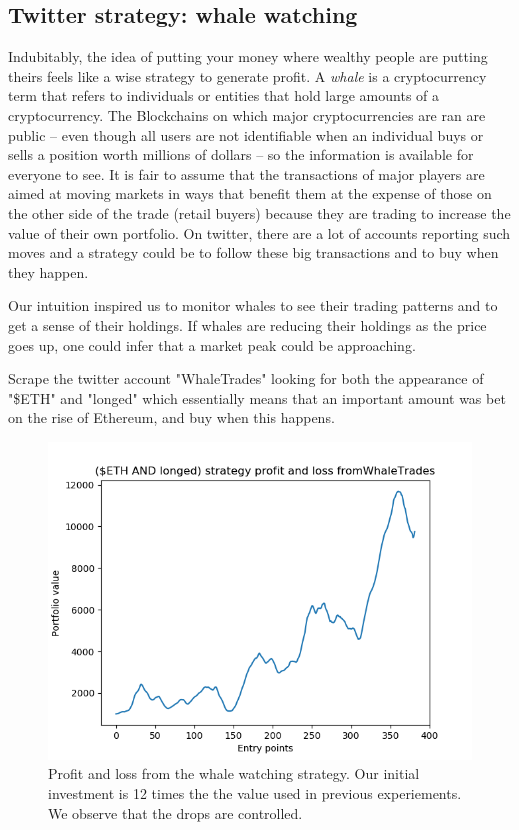 \documentclass[twoside]{report}
\begin{document}
\begin{spacing}{1}
\subsection{Twitter strategy: whale watching}
Indubitably, the idea of putting your money where wealthy people are putting theirs feels like a wise strategy to generate profit. A \textit{whale} is a cryptocurrency term that refers to individuals or entities that hold large amounts of a cryptocurrency. The Blockchains on which major cryptocurrencies are ran are public -- even though all users are not identifiable when an individual buys or sells a position worth millions of dollars -- so the information is available for everyone to see. It is fair to assume that the transactions of major players are aimed at moving markets in ways that benefit them at the expense of those on the other side of the trade (retail buyers) because they are trading to increase the value of their own portfolio. On twitter, there are a lot of accounts reporting such moves and a strategy could be to follow these big transactions and to buy when they happen.

Our intuition inspired us to monitor whales to see their trading patterns and to get a sense of their holdings. If whales are reducing their holdings as the price goes up, one could infer that a market peak could be approaching.
\begin{strategy}
Scrape the twitter account "WhaleTrades" looking for both the appearance of "\$ETH" and "longed" which essentially means that an important amount was bet on the rise of Ethereum, and buy when this happens. 
\end{strategy}\label{strat:sent} 

\begin{figure}[!htbp]
    \centering
    \includegraphics[scale = 0.5]{twitter_scraping/ETH-whales.png}
    \caption{Profit and loss from the whale watching strategy. Our initial investment is 12 times the the value used in previous experiements. We observe that the drops are controlled.}
    \label{fig: wwPnL}
\end{figure}


\end{spacing}
\end{document}
